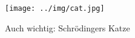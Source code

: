 \documentclass[6pt,a4paper]{scrartcl}
\begin{document}
\begin{multicols}{4}
	
	
	
	

	

 \parbox{2.0cm}{
\texttt{[image: ../img/cat.jpg]}
}
\parbox{4.0cm}{
	Auch wichtig: Schrödingers Katze
}


\end{multicols}

\end{document}

